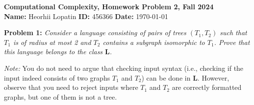 \documentclass[12pt]{article}
\newcommand{\assignmentTitle}{Computational Complexity, Homework Problem 2, Fall 2024}
\newcommand{\studentName}{Heorhii Lopatin}
\newcommand{\studentID}{456366}
\newcommand{\submissionDate}{\today}
\newenvironment{problem}[1]{\noindent\textbf{Problem #1:} \itshape}{\par\vspace{10pt}}
\begin{document}
\begin{center}
    {\Large \textbf{\assignmentTitle}}
    \\[10pt]
    \textbf{Name:} \studentName \hspace{1cm} \textbf{ID:} \studentID \hspace{1cm} \textbf{Date:} \submissionDate
\end{center}

\vspace{20pt}

\begin{problem}{1}
Consider a language consisting of pairs of trees \( (T_1, T_2) \) such that \( T_1 \) is of radius at most 2 and \( T_2 \) contains a subgraph isomorphic to \( T_1 \). Prove that this language belongs to the class \( \mathbf{L} \).

\textit{Note:} You do not need to argue that checking input syntax (i.e., checking if the input indeed consists of two graphs \( T_1 \) and \( T_2 \)) can be done in \( \mathbf{L} \). However, observe that you need to reject inputs where \( T_1 \) and \( T_2 \) are correctly formatted graphs, but one of them is not a tree.
\end{problem}
\end{document}
